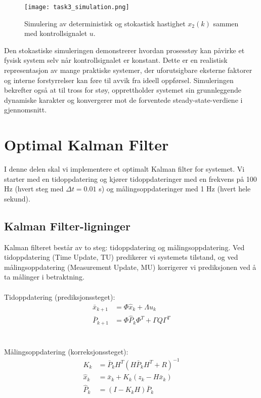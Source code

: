 \documentclass[a4paper,12pt]{article}
\theoremstyle{plain}
\begin{document}
\begin{figure}[ht]
    \centering
    \texttt{[image: task3\_simulation.png]}
    \caption{Simulering av deterministisk og stokastisk hastighet $x_2(k)$ sammen med kontrollsignalet $u$.}
    \label{fig:task3_plot}
\end{figure}

Den stokastiske simuleringen demonstrerer hvordan prosesstøy kan påvirke et fysisk system selv når kontrollsignalet er konstant. Dette er en realistisk representasjon av mange praktiske systemer, der uforutsigbare eksterne faktorer og interne forstyrrelser kan føre til avvik fra ideell oppførsel. Simuleringen bekrefter også at til tross for støy, opprettholder systemet sin grunnleggende dynamiske karakter og konvergerer mot de forventede steady-state-verdiene i gjennomsnitt.
\clearpage
\section{Optimal Kalman Filter}

I denne delen skal vi implementere et optimalt Kalman filter for systemet. Vi starter med en tidoppdatering og kjører tidoppdateringer med en frekvens på 100 Hz (hvert steg med $\Delta t = 0.01$ s) og målingsoppdateringer med 1 Hz (hvert hele sekund).
\subsection{Kalman Filter-ligninger}

Kalman filteret består av to steg: tidoppdatering og målingsoppdatering. Ved tidoppdatering (Time Update, TU) predikerer vi systemets tilstand, og ved målingsoppdatering (Measurement Update, MU) korrigerer vi prediksjonen ved å ta målinger i betraktning.
\\\\
Tidoppdatering (prediksjonssteget):
\begin{align}
\bar{x}_{k+1} &= \Phi \hat{x}_k + \Lambda u_k \\
\bar{P}_{k+1} &= \Phi \hat{P}_k \Phi^T + \Gamma Q \Gamma^T
\end{align}
\\\\
Målingsoppdatering (korreksjonssteget):
\begin{align}
K_k &= \bar{P}_k H^T (H \bar{P}_k H^T + R)^{-1} \\
\hat{x}_k &= \bar{x}_k + K_k (z_k - H \bar{x}_k) \\
\hat{P}_k &= (I - K_k H) \bar{P}_k
\end{align}
\end{document}
